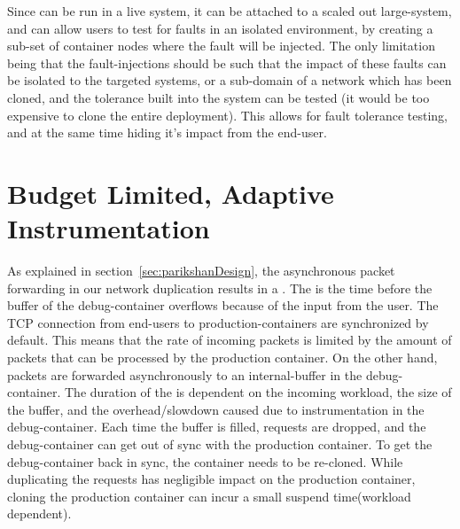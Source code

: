Since \parikshan can be run in a live system, it can be attached to a scaled out large-system, and can allow users to test for faults in an isolated environment, by creating a sub-set of \debugcontainer container nodes where the fault will be injected.
The only limitation being that the fault-injections should be such that the impact of these faults can be isolated to the targeted \debugcontainer systems, or a sub-domain of a network which has been cloned, and the tolerance built into the system can be tested (it would be too expensive to clone the entire deployment).
This allows for fault tolerance testing, and at the same time hiding it's impact from the end-user.

\section{Budget Limited, Adaptive Instrumentation}
\label{sec:activeBudgetLimited}

As explained in section~\ref{sec:parikshanDesign}, the asynchronous packet forwarding in our network duplication results in a \debugwindow.
The \debugwindow is the time before the buffer of the debug-container overflows because of the input from the user.
The TCP connection from end-users to production-containers are synchronized by default.
This means that the rate of incoming packets is limited by the amount of packets that can be processed by the production container.
On the other hand, packets are forwarded asynchronously to an internal-buffer in the debug-container.
The duration of the \debugwindow is dependent on the incoming workload, the size of the buffer, and the overhead/slowdown caused due to instrumentation in the debug-container.
Each time the buffer is filled, requests are dropped, and the debug-container can get out of sync with the production container.
To get the debug-container back in sync, the container needs to be re-cloned.
While duplicating the requests has negligible impact on the production container, cloning the production container can incur a small suspend time(workload dependent).

